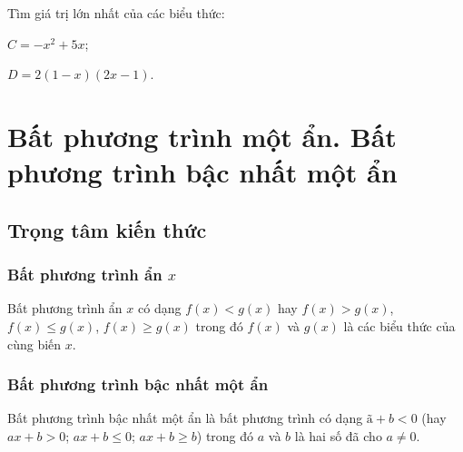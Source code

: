 \begin{bt}%
	Tìm giá trị lớn nhất của các biểu thức:
	\begin{enumEX}{2}
		\item $C=-x^2+5x$;
		\item $D=2(1-x)(2x-1)$.
	\end{enumEX}
\end{bt}

\section{Bất phương trình một ẩn. Bất phương trình bậc nhất một ẩn}

\subsection{Trọng tâm kiến thức}
\subsubsection{Bất phương trình ẩn $x$} Bất phương trình ẩn $x$ có dạng $f(x)<g(x)$ hay $f(x)>g(x)$, $f(x)\leq g(x)$, $f(x)\geq g(x)$ trong đó $f(x)$ và $g(x)$ là các biểu thức của cùng biến $x$.
	\subsubsection{Bất phương trình bậc nhất một ẩn} Bất phương trình bậc nhất một ẩn là bất phương trình có dạng $ã+b<0$ (hay $ax+b>0$; $ax+b\leq 0$; $ax+b\geq b$) trong đó $a$ và $b$ là hai số đã cho $a\neq 0$.
